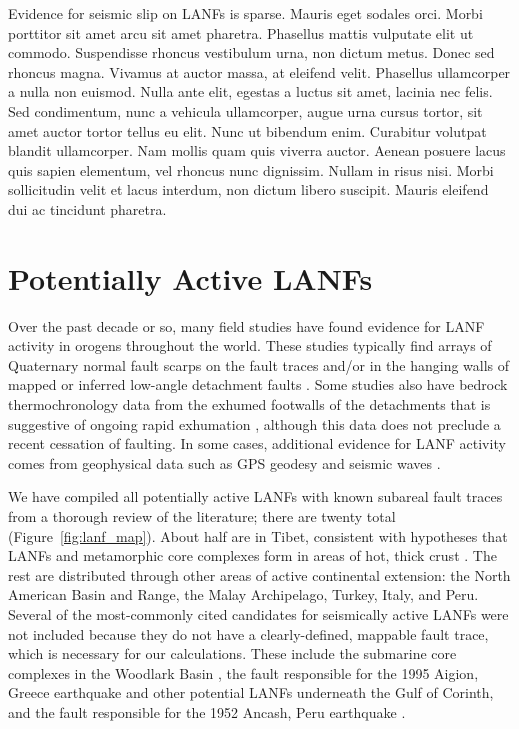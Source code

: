 \documentclass[twocolumn,grl]{AGUTeX}
\begin{document}
\begin{article}
Evidence for seismic slip on LANFs is sparse.  
Mauris eget sodales orci. Morbi porttitor sit amet arcu sit amet pharetra. Phasellus mattis vulputate elit ut commodo. Suspendisse rhoncus vestibulum urna, non dictum metus. Donec sed rhoncus magna. Vivamus at auctor massa, at eleifend velit. Phasellus ullamcorper a nulla non euismod. Nulla ante elit, egestas a luctus sit amet, lacinia nec felis. Sed condimentum, nunc a vehicula ullamcorper, augue urna cursus tortor, sit amet auctor tortor tellus eu elit. Nunc ut bibendum enim. Curabitur volutpat blandit ullamcorper. Nam mollis quam quis viverra auctor. Aenean posuere lacus quis sapien elementum, vel rhoncus nunc dignissim. Nullam in risus nisi. Morbi sollicitudin velit et lacus interdum, non dictum libero suscipit. Mauris eleifend dui ac tincidunt pharetra. 

\section{Potentially Active LANFs}

Over the past decade or so, many field studies have found evidence for LANF activity in orogens throughout the world. These studies typically find arrays of Quaternary normal fault scarps on the fault traces and/or in the hanging walls of mapped or inferred low-angle detachment faults \citep [e.g.,][]{axen1999baja}. Some studies also have bedrock thermochronology data from the exhumed footwalls of the detachments that is suggestive of ongoing rapid exhumation \citep [e.g.,][]{sundell2013lunggar}, although this data does not preclude a recent cessation of faulting. In some cases, additional evidence for LANF activity comes from geophysical data such as GPS geodesy \citep [e.g.,][]{hreinsdottir2009altotib} and seismic waves \citep [e.g.,][]{doser1987ancash}.

We have compiled all potentially active LANFs with known subareal fault traces from a thorough review of the literature; there are twenty total (Figure~\ref{fig:lanf_map}).  About half are in Tibet, consistent with hypotheses that LANFs and metamorphic core complexes form in areas of hot, thick crust \citep [e.g.,][]{buck1991mcc}.  The rest are distributed through other areas of active continental extension: the North American Basin and Range, the Malay Archipelago, Turkey, Italy, and Peru. Several of the most-commonly cited candidates for seismically active LANFs were not included because they do not have a clearly-defined, mappable fault trace, which is necessary for our calculations.  These include the submarine core complexes in the Woodlark Basin \citep{abers2001}, the fault responsible for the 1995 Aigion, Greece earthquake \citep{bernard1997} and other potential LANFs underneath the Gulf of Corinth, and the fault responsible for the 1952 Ancash, Peru earthquake \citep{doser1987ancash}.


\end{article}
\end{document}
